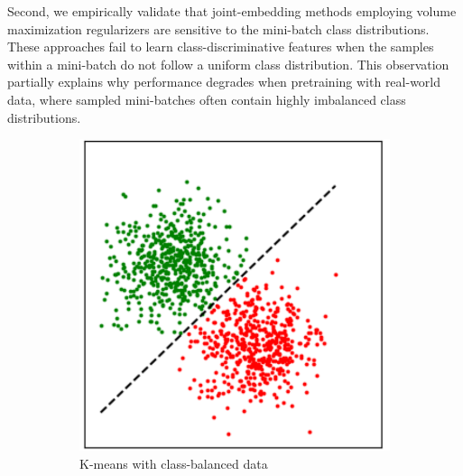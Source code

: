 \documentclass{article} %
\begin{document}

Second, we empirically validate that joint-embedding methods employing volume maximization regularizers are sensitive to the mini-batch class distributions.
These approaches fail to learn class-discriminative features when the samples within a mini-batch do not follow a uniform class distribution.
This observation partially explains why performance degrades when pretraining with real-world data, where sampled mini-batches often contain highly imbalanced class distributions.
\setlength{\columnsep}{4.5mm}
\begin{figure}
    \centering
    \begin{subfigure}{\linewidth}
        \centering
        \includegraphics[width=\linewidth]{assets/kmeans_0.5.pdf}
        \caption{K-means with class-balanced data}
        \label{fig:visu_rcdm_balanced}
    \end{subfigure}\\[1em]
    \begin{subfigure}{\linewidth}
        \centering

\end{subfigure}
\end{figure}
\end{document}
